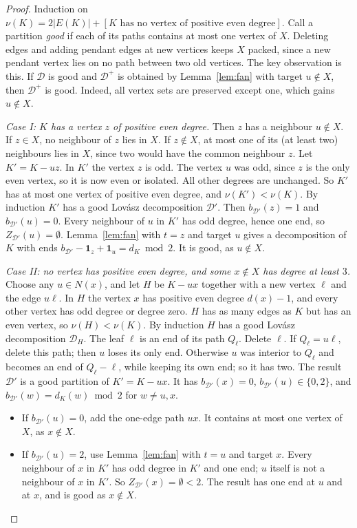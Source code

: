 \documentclass[11pt]{amsart}
\theoremstyle{definition}
\newcommand{\cD}{\mathcal D}
\begin{document}
\begin{proof}
Induction on $\nu(K)=2|E(K)|+[\text{$K$ has no vertex of positive even degree}]$. Call a partition
\emph{good} if each of its paths contains at most one vertex of $X$. Deleting edges and adding pendant
edges at new vertices keeps $X$ packed, since a new pendant vertex lies on no path between two old
vertices. The key observation is this. If $\cD$ is good and $\cD^+$ is obtained by Lemma~\ref{lem:fan}
with target $u\notin X$, then $\cD^+$ is good. Indeed, all vertex sets are preserved except one, which
gains $u\notin X$.

\emph{Case I: $K$ has a vertex $z$ of positive even degree.} Then $z$ has a neighbour $u\notin X$. If
$z\in X$, no neighbour of $z$ lies in $X$. If $z\notin X$, at most one of its (at least two)
neighbours lies in $X$, since two would have the common neighbour $z$. Let $K'=K-uz$. In $K'$ the
vertex $z$ is odd. The vertex $u$ was odd, since $z$ is the only even vertex, so it is now even or
isolated. All other degrees are unchanged. So $K'$ has at most one vertex of positive even degree, and
$\nu(K')<\nu(K)$. By induction $K'$ has a good Lov\'asz decomposition $\cD'$. Then
$b_{\cD'}(z)=1$ and $b_{\cD'}(u)=0$. Every neighbour of $u$ in $K'$ has odd degree, hence one end, so
$Z_{\cD'}(u)=\emptyset$. Lemma~\ref{lem:fan} with $t=z$ and target $u$ gives a decomposition of $K$
with ends $b_{\cD'}-\mathbf 1_z+\mathbf 1_u=d_K\bmod2$. It is good, as $u\notin X$.

\emph{Case II: no vertex has positive even degree, and some $x\notin X$ has degree at least $3$.}
Choose any $u\in N(x)$, and let $H$ be $K-ux$ together with a new vertex $\ell$ and the edge $u\ell$. In $H$
the vertex $x$ has positive even degree $d(x)-1$, and every other vertex has odd degree or degree zero.
$H$ has as many edges as $K$ but has an even vertex, so $\nu(H)<\nu(K)$. By induction $H$ has a good
Lov\'asz decomposition $\cD_H$. The leaf $\ell$ is an end of its path $Q_\ell$. Delete $\ell$. If
$Q_\ell=u\ell$, delete this path; then $u$ loses its only end. Otherwise $u$ was interior to $Q_\ell$ and
becomes an end of $Q_\ell-\ell$, while keeping its own end; so it has two. The result $\cD'$ is a good
partition of $K'=K-ux$. It has $b_{\cD'}(x)=0$, $b_{\cD'}(u)\in\{0,2\}$, and
$b_{\cD'}(w)=d_K(w)\bmod2$ for $w\ne u,x$.
\begin{itemize}
\item If $b_{\cD'}(u)=0$, add the one-edge path $ux$. It contains at most one vertex of $X$, as
$x\notin X$.
\item If $b_{\cD'}(u)=2$, use Lemma~\ref{lem:fan} with $t=u$ and target $x$. Every neighbour of $x$ in
$K'$ has odd degree in $K'$ and one end; $u$ itself is not a neighbour of $x$ in $K'$. So
$Z_{\cD'}(x)=\emptyset<2$. The result has one end at $u$ and at $x$, and is good as $x\notin X$.
\end{itemize}


\end{proof}
\end{document}
